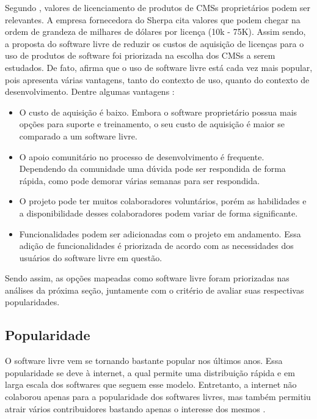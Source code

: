 Segundo , valores de licenciamento de produtos de CMSs proprietários podem ser relevantes. A empresa fornecedora do Sherpa cita valores que podem chegar na ordem de grandeza de milhares de dólares por licença (10k - 75K). Assim sendo, a proposta do software livre de reduzir os custos de aquisição de licenças para o uso de produtos de software foi priorizada na escolha dos CMSs a serem estudados.
De fato,  afirma que o uso de software livre está cada vez mais popular, pois apresenta várias vantagens, tanto do contexto de uso, quanto do contexto de desenvolvimento.  Dentre algumas vantagens \cite{Karels}:

\begin{itemize}
 \item O custo de aquisição é baixo. Embora o software proprietário possua mais opções para suporte e treinamento, o seu custo de aquisição é maior se comparado a um software livre.
 \item O apoio comunitário no processo de desenvolvimento é frequente. Dependendo da comunidade uma dúvida pode ser respondida de forma rápida, como pode demorar várias semanas para ser respondida.
 \item O projeto pode ter muitos colaboradores voluntários, porém as habilidades e a disponibilidade desses colaboradores podem variar de forma significante.
 \item Funcionalidades podem ser adicionadas com o projeto em andamento. Essa adição de funcionalidades é priorizada de acordo com as necessidades dos usuários do software livre em questão.
 
\end{itemize}

Sendo assim, as opções mapeadas como software livre foram priorizadas nas análises da próxima seção, juntamente com o critério de avaliar suas respectivas popularidades.

\subsection{Popularidade}
\label{popularidade_CMS}

O software livre vem se tornando bastante popular nos últimos anos. Essa popularidade se deve à internet, a qual permite uma distribuição rápida e em larga escala dos softwares que seguem esse modelo. Entretanto, a internet não colaborou apenas para a popularidade dos softwares livres, mas também permitiu atrair vários contribuidores bastando apenas o interesse dos mesmos \cite{salgado}. 
	
